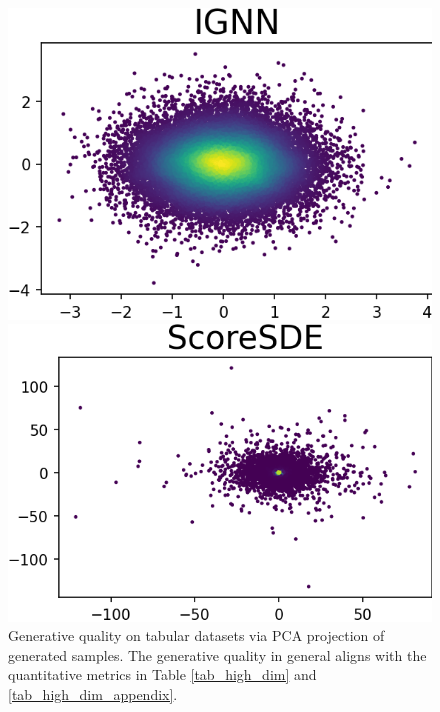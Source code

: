 \documentclass{article}
\theoremstyle{remark}
\theoremstyle{plain}
\begin{document}
{\begin{figure}[!t]
\begin{minipage}{0.15\textwidth}
    \end{minipage}
    \begin{minipage}{0.15\textwidth}
        \vspace{-0.2in}\includegraphics[width=\linewidth]{bsds300_PCA_2D_compare_IGNN.png}
    \end{minipage}
    \begin{minipage}{0.155\textwidth}
        \vspace{-0.2in}\includegraphics[width=\linewidth]{bsds300_PCA_2D_compare_ScoreSDE.png}
    \end{minipage}
    
    \caption{Generative quality on tabular datasets via PCA projection {of generated samples}. The generative quality in general aligns with the quantitative metrics in Table \ref{tab_high_dim} and \ref{tab_high_dim_appendix}.}
    \label{pca_projection}
\end{figure}

}
\end{document}
